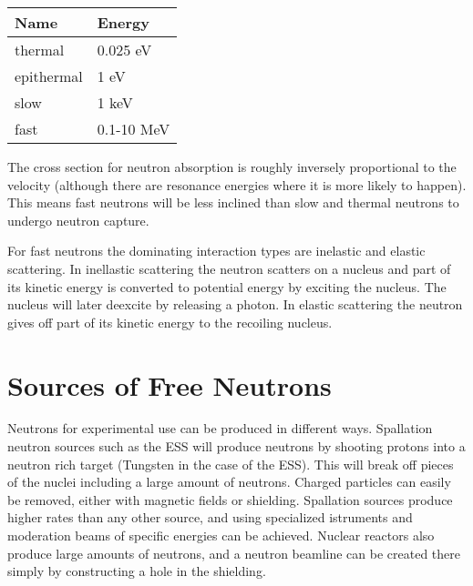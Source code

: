 \documentclass[main.tex]{subfiles}
\begin{document}
\begin{table}[h]
\center
\begin{tabular}{|l|l|}
\hline
\textbf{Name} & \textbf{Energy} \\ \hline
thermal       & 0.025 eV        \\ \hline
epithermal    & 1 eV            \\ \hline
slow          & 1 keV           \\ \hline
fast          & 0.1-10 MeV      \\ \hline
\end{tabular}
\label{tab:neutron}
\end{table}

The cross section for neutron absorption is roughly inversely proportional to the velocity (although there are resonance energies where it is more likely to happen). This means fast neutrons will be less inclined than slow and thermal neutrons to undergo neutron capture. 



For fast neutrons the dominating interaction types are inelastic and elastic scattering. In inellastic scattering the neutron scatters on a nucleus and part of its kinetic energy is converted to potential energy by exciting the nucleus. The nucleus will later deexcite by releasing a photon. In elastic scattering the neutron gives off part of its kinetic energy to the recoiling nucleus\cite[pg.63]{LEo}.



\section{Sources of Free Neutrons}
Neutrons for experimental use can be produced in different ways. Spallation neutron sources such as the ESS will produce neutrons by shooting protons into a neutron rich target (Tungsten in the case of the ESS). This will break off pieces of the nuclei including a large amount of neutrons. Charged particles can easily be removed, either with magnetic fields or shielding. Spallation sources produce higher rates than any other source, and using specialized istruments and moderation beams of specific energies can be achieved. Nuclear reactors also produce large amounts of neutrons, and a neutron beamline can be created there simply by constructing a hole in the shielding\cite[446]{Krane}. 
\end{document}
